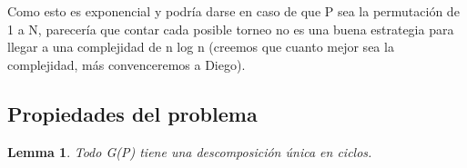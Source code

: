 	Como esto es exponencial y podría darse en caso de que P sea la permutación de 1 a N, parecería que contar cada posible torneo no es una buena estrategia para llegar a una complejidad de n log n (creemos que cuanto mejor sea la complejidad, más convenceremos a Diego).  \newline

\subsection{Propiedades del problema}

\newtheorem{theorem}{Lemma}
\newtheorem{corollary}{Corolario}[theorem]


\begin{theorem}
	Todo G(P) tiene una descomposición única en ciclos.
\end{theorem}

